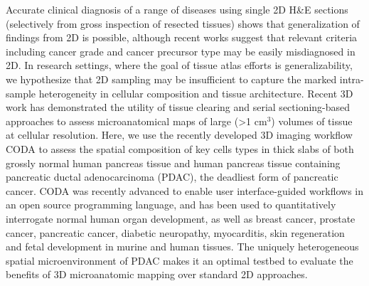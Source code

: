 \begin{refsection}
    Accurate clinical diagnosis of a range of diseases using single 2D H\&E sections (selectively from gross inspection of resected tissues) shows that generalization of findings from 2D is possible, although recent works suggest that relevant criteria including cancer grade and cancer precursor type may be easily misdiagnosed in 2D\cite{KiemenPanIN,Triage,Winetraub2021OCT2Hist,Liu2023Engineering,Song2023Weakly}. In research settings, where the goal of tissue atlas efforts is generalizability, we hypothesize that 2D sampling may be insufficient to capture the marked intra-sample heterogeneity in cellular composition and tissue architecture.
    Recent 3D work has demonstrated the utility of tissue clearing and serial sectioning-based approaches to assess microanatomical maps of large (>1 cm$^3$) volumes of tissue at cellular resolution\cite{Fischer2008Hematoxylin,Liu2024Engineering,Susaki2014Whole,Hong2020Three,Koyuncu2023Visual,Crawford2024Combined,Kiemen2023Tissue,Bishop2024end,KiemenHighResolution,Tempest2020Histological,Barmpoutis2021Tertiary,Kiemen2024Magnetic,Liu2021Harnessing,Onozato2012role,Langer2019Modeling}. Here, we use the recently developed 3D imaging workflow CODA to assess the spatial composition of key cells types in thick slabs of both grossly normal human pancreas tissue and human pancreas tissue containing pancreatic ductal adenocarcinoma (PDAC), the deadliest form of pancreatic cancer\cite{Kiemen2022CODA}. CODA was recently advanced to enable user interface-guided workflows in an open source programming language\cite{Matos2025CODAvision}, and has been used to quantitatively interrogate normal human organ development, as well as breast cancer, prostate cancer, pancreatic cancer, diabetic neuropathy, myocarditis, skin regeneration and fetal development in murine and human tissues\cite{Crawford2024Combined,Xue2022Mechanical,Yang2022Engineered,Forjaz2025Integration,OBrien2024Skin,Kiemen2023Intraparenchymal,Groot2021Characterization,Sneider2022Deep,Kiemen20243D,Steele2020Multimodal}. The uniquely heterogeneous spatial microenvironment of PDAC makes it an optimal testbed to evaluate the benefits of 3D microanatomic mapping over standard 2D approaches\cite{Steele2020Multimodal,Wang2020Multiparametric,Raphael2017Integrated}.  

\end{refsection}
